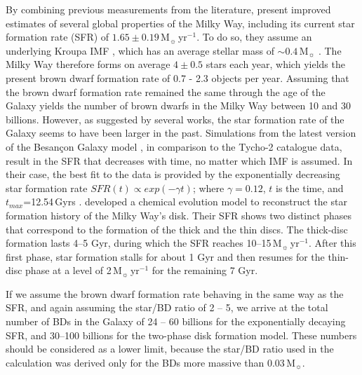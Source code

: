 \documentclass[a4paper,fleqn,usenatbib]{mnras}
\begin{document}
By combining previous measurements from the literature, \citet{licquia15} present improved estimates of several global properties of the Milky Way, 
including its current star formation rate (SFR) of $1.65\pm 0.19$\,M$_{\sun}$\,yr$^{-1}$.
To do so, they assume an underlying Kroupa IMF \citep{kroupa01}, which has an average stellar mass of $\sim 0.4\,$M$_{\sun}$ \citep{marks&kroupa12}.
The Milky Way therefore forms on average $4\pm0.5$ stars each year, which yields the present brown dwarf formation rate of 0.7 - 2.3 objects per year.
Assuming that the brown dwarf formation rate remained the same through the age of the Galaxy 
yields the number of brown dwarfs in the Milky Way between 10 and 30 billions. 
However, as suggested by several works, the star formation rate of the Galaxy seems to have been larger in the past.
Simulations from the latest version of the Besan\c{c}on Galaxy model \citep{czekaj14}, in comparison
to the Tycho-2 catalogue data, result in the SFR that decreases with time, no matter which IMF is assumed.
In their case, the best fit to the data is provided by the exponentially decreasing star formation rate $SFR(t)\propto exp(-\gamma t)$; where $\gamma=0.12$, $t$ is the time, and $t_{max}$=12.54\,Gyrs \citep{aumer&binney09}.
\citet{snaith15} developed a chemical evolution model to reconstruct the star formation history of the Milky Way's disk. Their SFR shows 
 two distinct phases that correspond to the formation of the
thick and the thin discs. The thick-disc formation lasts 4--5 Gyr,
during which the SFR reaches 10--15\,M$_{\sun}$\,yr$^{-1}$. After this first phase, 
star formation stalls for about 1 Gyr and then resumes
for the thin-disc phase at a level of 2\,M$_{\sun}$\,yr$^{-1}$
for the remaining 7 Gyr.

If we assume the brown dwarf formation rate behaving in the same way as the SFR, and again assuming the star/BD ratio of 2 -- 5, we arrive at the total number of 
BDs in the Galaxy of 24 -- 60 billions for the exponentially decaying SFR, and 30--100 billions for the two-phase disk formation model. 
These numbers should be considered as a lower limit, because the star/BD ratio used
in the calculation was derived only for the BDs more massive than 0.03\,M$_{\sun}$.
\end{document}
